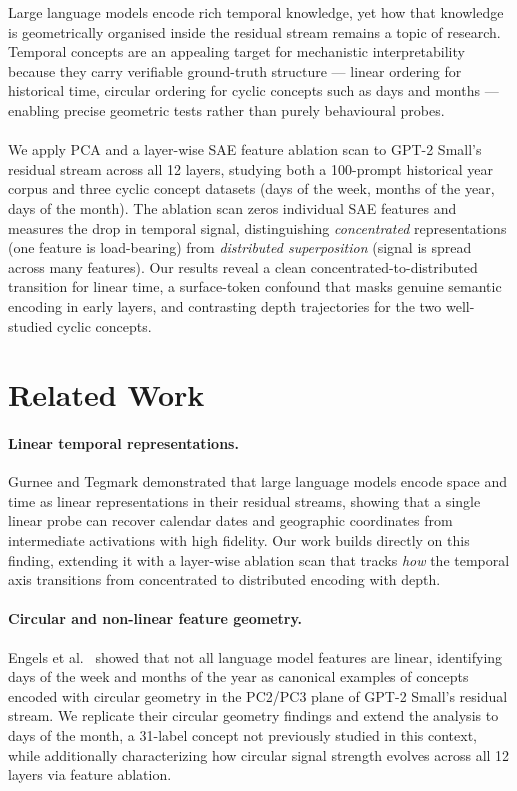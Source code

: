 \documentclass[11pt]{article}
\begin{document}
Large language models encode rich temporal knowledge, yet how that knowledge is geometrically organised inside the residual stream
remains a topic of research. Temporal concepts are an appealing target for mechanistic interpretability because they carry verifiable
ground-truth structure --- linear ordering for historical time, circular ordering for cyclic concepts such as days and months ---
enabling precise geometric tests rather than purely behavioural probes.
\\
\\
We apply PCA and a layer-wise SAE feature ablation scan to GPT-2 Small's residual stream across all 12 layers, studying both a
100-prompt historical year corpus and three cyclic concept datasets (days of the week, months of the year, days of the month).
The ablation scan zeros individual SAE features and measures the drop in temporal signal, distinguishing \textit{concentrated}
representations (one feature is load-bearing) from \textit{distributed superposition} (signal is spread across many features).
Our results reveal a clean concentrated-to-distributed transition for linear time, a surface-token confound that masks genuine
semantic encoding in early layers, and contrasting depth trajectories for the two well-studied cyclic concepts.

\section{Related Work}

\paragraph{Linear temporal representations.}
Gurnee and Tegmark \cite{gurnee2023language} demonstrated that large language models encode space and time as linear representations in their residual streams, showing that a single linear probe can recover calendar dates and geographic coordinates from intermediate activations with high fidelity. Our work builds directly on this finding, extending it with a layer-wise ablation scan that tracks \emph{how} the temporal axis transitions from concentrated to distributed encoding with depth.

\paragraph{Circular and non-linear feature geometry.}
Engels et al.\ \cite{engels2024} showed that not all language model features are linear, identifying days of the week and months of the year as canonical examples of concepts encoded with circular geometry in the PC2/PC3 plane of GPT-2 Small's residual stream. We replicate their circular geometry findings and extend the analysis to days of the month, a 31-label concept not previously studied in this context, while additionally characterizing how circular signal strength evolves across all 12 layers via feature ablation.
\end{document}
